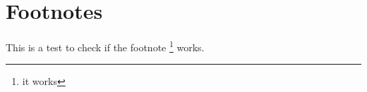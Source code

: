 \documentclass[12pt]{article}
\begin{document}
\section{Footnotes}

This is a test to check if the footnote \footnote[10]{it works} works.
\end{document}
